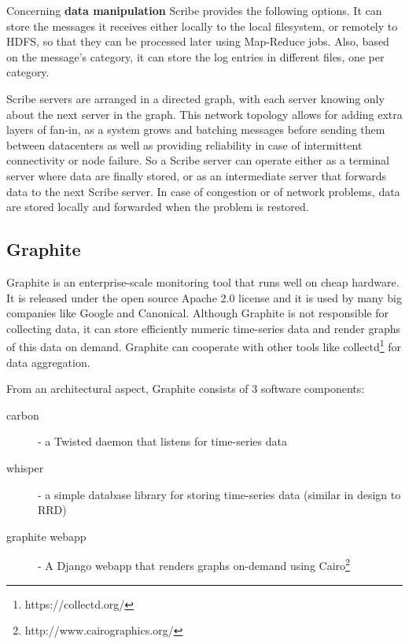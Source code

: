Concerning \textbf{data manipulation} Scribe provides the following options. It
can store the messages it receives either locally to the local filesystem, or
remotely to HDFS, so that they can be processed later using Map-Reduce jobs.
Also, based on the message's category, it can store the log entries in different
files, one per category.

Scribe servers are arranged in a directed graph, with each server
knowing only about the next server in the graph. This network topology allows
for adding extra layers of fan-in, as a system grows and batching messages
before sending them between datacenters as well as providing reliability in case
of intermittent connectivity or node failure. So a Scribe server can operate
either as a terminal server where data are finally stored, or as an intermediate
server that forwards data to the next Scribe server. In case of congestion or of
network problems, data are stored locally and forwarded when the problem is
restored.

\subsection{Graphite} 
Graphite is an enterprise-scale monitoring tool that runs well on cheap
hardware. It is released under the open source Apache 2.0 license and it is
used by many big companies like Google and Canonical. Although Graphite is not
responsible for collecting data, it can store efficiently numeric time-series
data and render graphs of this data on demand. Graphite can cooperate with other
tools like collectd\footnote{https://collectd.org/} for data aggregation.

From an architectural aspect, Graphite consists of 3 software components:

\begin{description}
\item[carbon] - a Twisted daemon that listens for time-series data
\item[whisper] - a simple database library for storing time-series data (similar
in design to RRD)
\item[graphite webapp] - A Django webapp that renders graphs on-demand using
Cairo\footnote{http://www.cairographics.org/}
\end{description}

